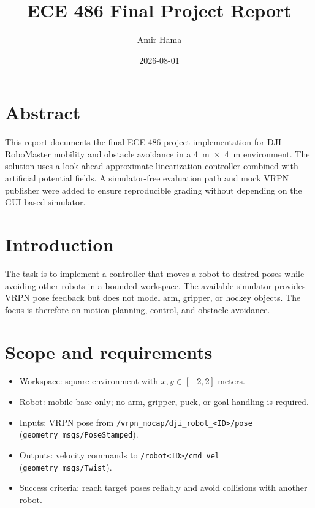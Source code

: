 \documentclass[11pt,a4paper]{article}
\title{ECE 486 Final Project Report}
\author{Amir Hama}
\date{2026-08-01}
\begin{document}
\maketitle
\tableofcontents
\listoffigures
\newpage

\section{Abstract}
This report documents the final ECE 486 project implementation for DJI RoboMaster mobility and obstacle avoidance in a 4~m~$\times$~4~m environment. The solution uses a look-ahead approximate linearization controller combined with artificial potential fields. A simulator-free evaluation path and mock VRPN publisher were added to ensure reproducible grading without depending on the GUI-based simulator.

\section{Introduction}
The task is to implement a controller that moves a robot to desired poses while avoiding other robots in a bounded workspace. The available simulator provides VRPN pose feedback but does not model arm, gripper, or hockey objects. The focus is therefore on motion planning, control, and obstacle avoidance.

\section{Scope and requirements}
\begin{itemize}
  \item Workspace: square environment with $x, y \in [-2, 2]$ meters.
  \item Robot: mobile base only; no arm, gripper, puck, or goal handling is required.
  \item Inputs: VRPN pose from \texttt{/vrpn_mocap/dji_robot\_<ID>/pose} (\texttt{geometry_msgs/PoseStamped}).
  \item Outputs: velocity commands to \texttt{/robot<ID>/cmd_vel} (\texttt{geometry_msgs/Twist}).
  \item Success criteria: reach target poses reliably and avoid collisions with another robot.
\end{itemize}
\end{document}
